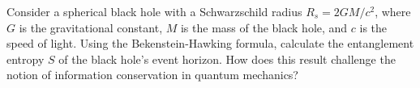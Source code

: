 \documentclass[border=10pt]{standalone}
\begin{document}
\begin{tcolorbox}[
    enhanced,
    colback=black!5,
    colframe=purple!70!black,
    boxrule=1pt,
    arc=10pt,
    outer arc=5pt,
    fontupper=\color{purple!70!black}\sffamily,
    drop shadow={black,opacity=0.7}
]
Consider a spherical black hole with a Schwarzschild radius $R_s = 2GM/c^2$, where $G$ is the gravitational constant, $M$ is the mass of the black hole, and $c$ is the speed of light. Using the Bekenstein-Hawking formula, calculate the entanglement entropy $S$ of the black hole's event horizon. How does this result challenge the notion of information conservation in quantum mechanics?
\end{tcolorbox}
\end{document}
